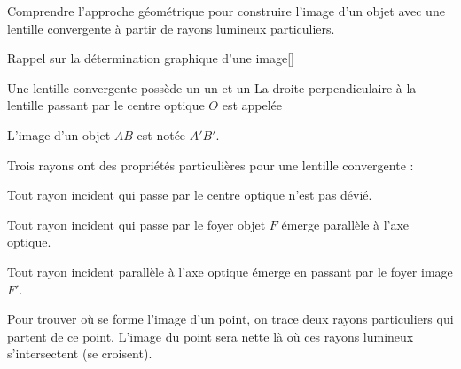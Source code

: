\teteSndLumi

\vspace*{-30pt}


\begin{objectifs}
  \item Comprendre l'approche géométrique pour construire l'image d'un objet avec une lentille convergente à partir de rayons lumineux particuliers.
\end{objectifs}


\begin{doc}{Rappel sur la détermination graphique d'une image}[\label{doc:formation_image}]
  \begin{importants}
    Une lentille convergente possède un  un et un 
    La droite perpendiculaire à la lentille passant par le centre optique $O$ est appelée 
  \end{importants}
  L'image d'un objet $AB$ est notée $A'B'$.
  
  \begin{center}
  \end{center}
  
  \begin{importants}
    Trois rayons ont des propriétés particulières pour une lentille convergente :
  \begin{listePoints}
    \item Tout rayon incident qui passe par le centre optique n'est pas dévié.
    \item Tout rayon incident qui passe par le foyer objet $F$ émerge parallèle à l'axe optique.
    \item Tout rayon incident parallèle à l'axe optique émerge en passant par le foyer image $F'$.
  \end{listePoints}
  \end{importants}
  Pour trouver où se forme l'image d'un point, on trace deux rayons particuliers qui partent de ce point. 
  L'image du point sera nette là où ces rayons lumineux s'intersectent (se croisent).
\end{doc}

